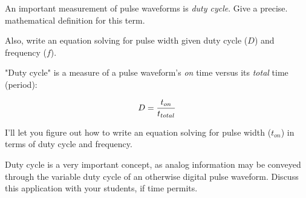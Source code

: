 

An important measurement of pulse waveforms is {\it duty cycle}.  Give a precise. mathematical definition for this term.

\vskip 10pt

Also, write an equation solving for pulse width given duty cycle ($D$) and frequency ($f$).







"Duty cycle" is a measure of a pulse waveform's {\it on} time versus its {\it total} time (period):

$$D = {t_{on} \over t_{total}}$$

I'll let you figure out how to write an equation solving for pulse width ($t_{on}$) in terms of duty cycle and frequency.







Duty cycle is a very important concept, as analog information may be conveyed through the variable duty cycle of an otherwise digital pulse waveform.  Discuss this application with your students, if time permits.




